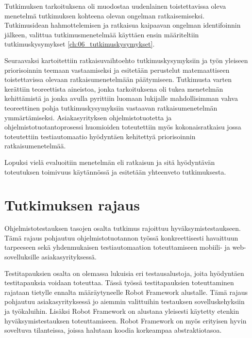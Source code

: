 
  Tutkimuksen tarkoituksena oli muodostaa uudenlainen toistettavissa oleva menetelmä tutkimuksen kohteena olevan ongelman ratkaisemiseksi.
  Tutkimusidean hahmottelemisen ja ratkaisua kaipaavan ongelman identifoinnin jälkeen, valittua tutkimusmenetelmää käyttäen ensin määriteltiin tutkimuskysymykset \ref{ch:06_tutkimuskysymykset}.

  Seuraavaksi kartoitettiin ratkaisuvaihtoehto tutkimuskysymyksiin ja työn yleiseen priorisoinnin teemaan vastaamiseksi ja esitetään perustelut matemaattiseen toistettavissa olevaan ratkaisumenetelmään päätymiseen.
  Tutkimusta varten kerättiin teoreettista aineistoa, jonka tarkoituksena oli tukea menetelmän kehittämistä ja jonka avulla pyrittiin luomaan lukijalle mahdollisimman vahva teoreettinen pohja tutkimuskysymyksiin vastaavan ratkaisumenetelmän ymmärtämiseksi.
  Asiakasyrityksen ohjelmistotuotetta ja ohjelmistotuotantoprosessi huomioiden toteutettiin myös kokonaisratkaisu jossa toteutettiin testiautomaatio hyödyntäen kehitettyä priorisoinnin ratkaisumenetelmää.

  Lopuksi vielä evaluoitiin menetelmän eli ratkaisun ja sitä hyödyntävän toteutuksen toimivuus käytännössä ja esitetään yhteenveto tutkimuksesta.

\section{Tutkimuksen rajaus} \label{ch:06_tutkimuksen_rajaus}

  Ohjelmistotestauksen tasojen osalta tutkimus rajoittuu hyväksymistestaukseen.
  Tämä rajaus pohjautuu ohjelmistotuotannon työssä konkreettisesti havaittuun tarpeeseen sekä yhdenmukaisen testiautomaation toteuttamiseen mobiili- ja web-sovelluksille asiakasyrityksessä.

  Testitapauksien osalta on olemassa lukuisia eri testausalustoja, joita hyödyntäen testitapauksia voidaan toteuttaa.
  Tässä työssä testitapauksien toteuttaminen rajataan tietylle ennalta määräytyneelle Robot Framework alustalle.
  Tämä rajaus pohjautuu asiakasyrityksessä jo aiemmin valittuihin testauksen sovelluskehyksiin ja työkaluihin.
  Lisäksi Robot Framework on alustana yleisesti käytetty etenkin hyväksymistestauksen toteuttamiseen.
  Robot Framework on myös erityisen hyvin soveltuva tilanteissa, joissa halutaan koodia korkeampaa abstraktiotasoa.

